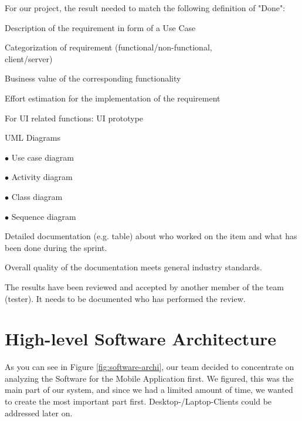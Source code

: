 \documentclass[a4paper, 12pt]{article}
\begin{document}
For our project, the result needed to match the following definition of "Done":

\begin{todolist}
\item Description of the requirement in form of a Use Case
\item Categorization of requirement (functional/non-functional,\\
      client/server)
\item Business value of the corresponding functionality
\item Effort estimation for the implementation of the requirement
\item For UI related functions: UI prototype
\item UML Diagrams 

    $\bullet$ Use case diagram
    
    $\bullet$ Activity diagram
    
    $\bullet$ Class diagram
    
    $\bullet$ Sequence diagram
    
\item Detailed documentation (e.g. table) about who worked on the item and what has been done during the sprint.
\item Overall quality of the documentation meets general industry standards.
\item The results have been reviewed and accepted by another member of the team (tester). It needs to be documented who has performed the review.
\end{todolist}
\section{High-level Software Architecture}
As you can see in Figure \ref{fig:software-archi}, our team decided to concentrate on analyzing the Software for the Mobile Application first. We figured, this was the main part of our system, and since we had a limited amount of time, we wanted to create the most important part first. Desktop-/Laptop-Clients could be addressed later on.
\end{document}
